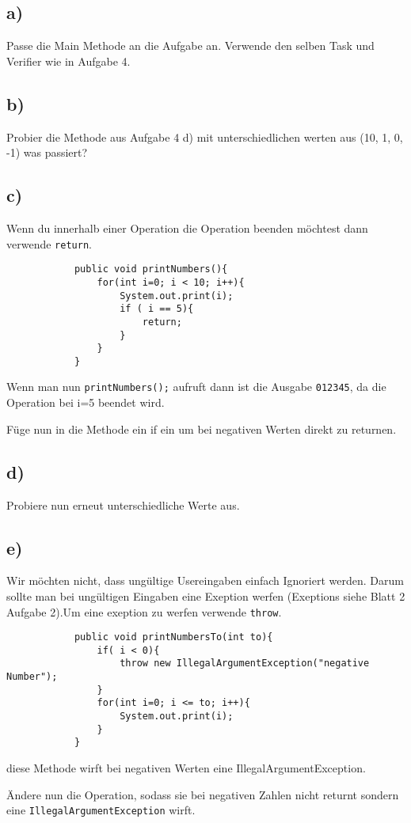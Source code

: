 \subsection*{a)}
	Passe die Main Methode an die Aufgabe an. Verwende den selben Task und Verifier wie in Aufgabe 4.
\subsection*{b)}
	Probier die Methode aus Aufgabe 4 d) mit unterschiedlichen werten aus (10, 1, 0, -1) was passiert?
\subsection*{c)}
	\begin{Infobox}[Return]
		Wenn du innerhalb einer Operation die Operation beenden möchtest dann verwende \lstinline{return}.
		\begin{lstlisting}
			public void printNumbers(){
				for(int i=0; i < 10; i++){
					System.out.print(i);
					if ( i == 5){
						return;
					}
				}
			}
		\end{lstlisting}
		Wenn man nun \lstinline{printNumbers();} aufruft dann ist die Ausgabe  \lstinline{012345}, da die Operation bei i=5 beendet wird.
	\end{Infobox}
	Füge nun in die Methode ein if ein um bei negativen Werten direkt zu returnen.
\subsection*{d)}
	Probiere nun erneut unterschiedliche Werte aus.
\subsection*{e)}
	\begin{Infobox}
	Wir möchten nicht, dass ungültige Usereingaben einfach Ignoriert werden. Darum sollte man bei ungültigen Eingaben eine Exeption werfen (Exeptions siehe Blatt 2 Aufgabe 2).Um eine exeption zu werfen verwende \lstinline{throw}.
	 	\begin{lstlisting}
			public void printNumbersTo(int to){
				if( i < 0){
					throw new IllegalArgumentException("negative Number");	
				}
				for(int i=0; i <= to; i++){
					System.out.print(i);
				}
			}
		\end{lstlisting}
	diese Methode wirft bei negativen Werten eine IllegalArgumentException.
	\end{Infobox}
	Ändere nun die Operation, sodass sie bei negativen Zahlen nicht returnt sondern eine \lstinline{IllegalArgumentException} wirft.
